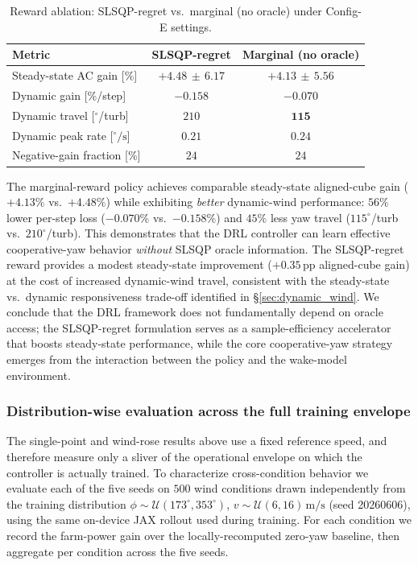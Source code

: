 \documentclass[final,5p,times]{elsarticle}
\begin{document}
\begin{table}[h]
\centering
\caption{Reward ablation: SLSQP-regret vs.\ marginal (no oracle) under Config-E settings.}
\label{tab:reward_ablation}
\small
\begin{tabular}{lcc}
\toprule
Metric & SLSQP-regret & Marginal (no oracle) \\
\midrule
Steady-state AC gain [\%] & $+4.48\,\pm\,6.17$ & $+4.13\,\pm\,5.56$ \\
Dynamic gain [\%/step] & $-0.158$ & $\mathbf{-0.070}$ \\
Dynamic travel [$^\circ$/turb] & $210$ & $\mathbf{115}$ \\
Dynamic peak rate [$^\circ\!/\!\mathrm{s}$] & $0.21$ & $0.24$ \\
Negative-gain fraction [\%] & $24$ & $24$ \\
\bottomrule
\end{tabular}
\end{table}

The marginal-reward policy achieves comparable steady-state aligned-cube gain ($+4.13\%$ vs.\ $+4.48\%$) while exhibiting \emph{better} dynamic-wind performance: $56\%$ lower per-step loss ($-0.070\%$ vs.\ $-0.158\%$) and $45\%$ less yaw travel ($115^\circ$/turb vs.\ $210^\circ$/turb). This demonstrates that the DRL controller can learn effective cooperative-yaw behavior \emph{without} SLSQP oracle information. The SLSQP-regret reward provides a modest steady-state improvement ($+0.35$\,pp aligned-cube gain) at the cost of increased dynamic-wind travel, consistent with the steady-state vs.\ dynamic responsiveness trade-off identified in \S\ref{sec:dynamic_wind}. We conclude that the DRL framework does not fundamentally depend on oracle access; the SLSQP-regret formulation serves as a sample-efficiency accelerator that boosts steady-state performance, while the core cooperative-yaw strategy emerges from the interaction between the policy and the wake-model environment.

\subsubsection{Distribution-wise evaluation across the full training envelope}\label{sec:dist_eval}
The single-point and wind-rose results above use a fixed reference speed, and therefore measure only a sliver of the operational envelope on which the controller is actually trained. To characterize cross-condition behavior we evaluate each of the five seeds on $500$ wind conditions drawn independently from the training distribution $\phi\!\sim\!\mathcal{U}(173^\circ,353^\circ)$, $v\!\sim\!\mathcal{U}(6,16)\,\mathrm{m/s}$ (seed 20260606), using the same on-device JAX rollout used during training. For each condition we record the farm-power gain over the locally-recomputed zero-yaw baseline, then aggregate per condition across the five seeds.
\end{document}
